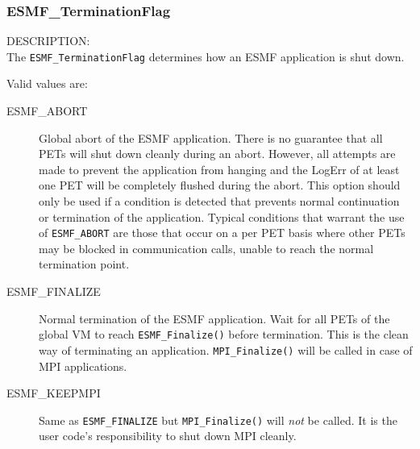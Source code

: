 
\subsubsection{ESMF\_TerminationFlag}
\label{app:terminationflag}

{\sf DESCRIPTION:\\}
The {\tt ESMF\_TerminationFlag} determines how an ESMF application is shut down.

Valid values are:
\begin{description}
   \item [ESMF\_ABORT] 
         Global abort of the ESMF application. There is no guarantee 
         that all PETs will shut down cleanly during an abort. However, all
         attempts are made to prevent the application from hanging and the
         LogErr of at least one PET will be completely flushed during the abort.
         This option should only be used if a condition is detected that
         prevents normal continuation or termination of the application.
         Typical conditions that warrant the use of {\tt ESMF\_ABORT} are those
         that occur on a per PET basis where other PETs may be blocked in 
         communication calls, unable to reach the normal termination point.
   \item [ESMF\_FINALIZE]
         Normal termination of the ESMF application. Wait for all PETs of the
         global VM to reach {\tt ESMF\_Finalize()} before termination. This is
         the clean way of terminating an application. {\tt MPI_Finalize()} will
         be called in case of MPI applications.
   \item [ESMF\_KEEPMPI]
         Same as {\tt ESMF\_FINALIZE} but {\tt MPI_Finalize()} will {\em not}
         be called. It is the user code's responsibility to shut down MPI
         cleanly.
\end{description}
